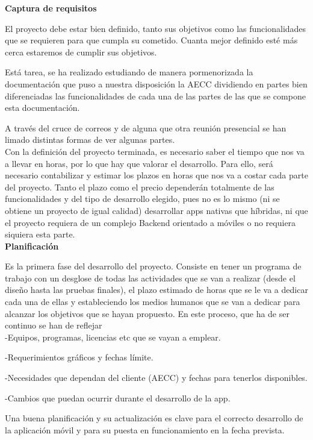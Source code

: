 \documentclass[../pfc.tex]{subfiles}
\begin{document}
	\textbf{Captura de requisitos}
	
	El proyecto debe estar bien definido, tanto sus objetivos como las funcionalidades que se requieren para que cumpla su cometido. Cuanta mejor definido esté más cerca estaremos de cumplir sus objetivos.
	
	Está tarea, se ha realizado estudiando de manera pormenorizada la documentación que puso a nuestra disposición la AECC dividiendo en partes bien diferenciadas las funcionalidades de cada una de las partes de las que se compone esta documentación.
	
	A través del cruce de correos y de alguna que otra reunión presencial se han limado distintas formas de ver algunas partes.\\
	
		
	Con la definición del proyecto terminada, es necesario saber el tiempo que nos va a llevar en horas, por lo que hay que valorar el desarrollo. Para ello, será necesario contabilizar y estimar los plazos en horas que nos va a costar cada parte del proyecto. Tanto el plazo como el precio dependerán totalmente de las funcionalidades y del tipo de desarrollo elegido, pues no es lo mismo (ni se obtiene un proyecto de igual calidad) desarrollar apps nativas que híbridas, ni que el proyecto requiera de un complejo Backend orientado a móviles o no requiera siquiera esta parte.\\
	
	\textbf{Planificación} 
		
	Es la primera fase del desarrollo del proyecto. Consiste en tener un programa de trabajo con un desglose de todas las actividades que se van a realizar (desde el diseño hasta las pruebas finales), el plazo estimado de horas que se le va a dedicar cada una de ellas y estableciendo los medios humanos que se van a dedicar para alcanzar los objetivos que se hayan propuesto. En este proceso, que ha de ser continuo se han de reflejar\\
	
	-Equipos, programas, licencias etc que se vayan a emplear.
	
	-Requerimientos gráficos y fechas límite.
	
	-Necesidades que dependan del cliente (AECC) y fechas para tenerlos disponibles.
	
	-Cambios que puedan ocurrir durante el desarrollo de la app.
	
	Una buena planificación y su actualización es clave para el correcto desarrollo de la aplicación móvil y para su puesta en funcionamiento en la fecha prevista.\\  
	
\end{document}
